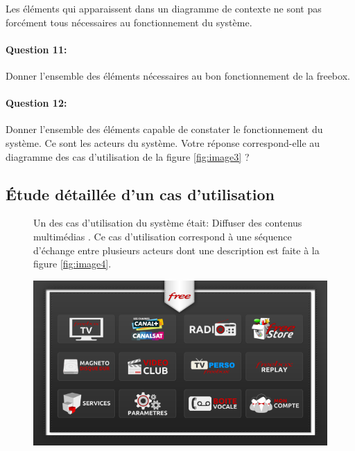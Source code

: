 Les éléments qui apparaissent dans un diagramme de contexte ne sont pas forcément tous nécessaires au fonctionnement du système.

\paragraph{Question 11:} Donner l'ensemble des éléments nécessaires au bon fonctionnement de la freebox.

\paragraph{Question 12:} Donner l'ensemble des éléments capable de \og constater \fg le fonctionnement du système. Ce sont les acteurs du système. Votre réponse correspond-elle au diagramme des cas d'utilisation de la figure \ref{fig:image3} ?

\subsection{Étude détaillée d'un cas d'utilisation}

\begin{figure}[!h]
\begin{minipage}{0.58\linewidth}
Un des cas d'utilisation du système était: \og Diffuser des contenus multimédias \fg. Ce cas d'utilisation correspond à une séquence d'échange entre plusieurs acteurs dont une description est faite à la figure \ref{fig:image4}.
\end{minipage}
\hfill
\begin{minipage}{0.4\linewidth}
\includegraphics[width=0.8\linewidth]{img/menu}
\end{minipage}
\end{figure}

